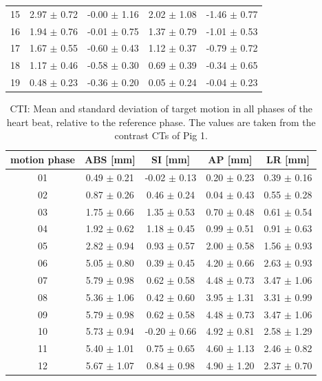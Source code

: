 \documentclass[type=dr, dr=rernat, accentcolor=tud7b,colorbacktitle, bigchapter, openright, twoside, 12pt ]{tudthesis}
\begin{document}
\begin{table}[htbp]
\begin{tabular}{|c|c|c|c|c|}
15 &2.97 $\pm$ 0.72 &-0.00 $\pm$ 1.16 &2.02 $\pm$ 1.08 &-1.46 $\pm$ 0.77 \\
16 &1.94 $\pm$ 0.76 &-0.01 $\pm$ 0.75 &1.37 $\pm$ 0.79 &-1.01 $\pm$ 0.53 \\
17 &1.67 $\pm$ 0.55 &-0.60 $\pm$ 0.43 &1.12 $\pm$ 0.37 &-0.79 $\pm$ 0.72 \\
18 &1.17 $\pm$ 0.46 &-0.58 $\pm$ 0.30 &0.69 $\pm$ 0.39 &-0.34 $\pm$ 0.65 \\
19 &0.48 $\pm$ 0.23 &-0.36 $\pm$ 0.20 &0.05 $\pm$ 0.24 &-0.04 $\pm$ 0.23 \\
    \hline\hline
  \end{tabular}
  \label{tab:motion:PV:Pig1}
\end{table}

\begin{table}[htbp]
  \centering
  \tiny
  \caption{CTI: Mean and standard deviation of target motion in all phases of the heart beat, relative to the reference phase. The values are 
  taken from the contrast CTs of Pig 1.}
  \begin{tabular}{|c|c|c|c|c|}
    \hline\hline
    motion phase\rule{0pt}{2.6ex}\rule[-1.2ex]{0pt}{0pt} & ABS [mm] & SI [mm] & AP [mm] & LR [mm]\\
    \hline
01 &0.49 $\pm$ 0.21 &-0.02 $\pm$ 0.13 &0.20 $\pm$ 0.23 &0.39 $\pm$ 0.16 \\
02 &0.87 $\pm$ 0.26 &0.46 $\pm$ 0.24 &0.04 $\pm$ 0.43 &0.55 $\pm$ 0.28 \\
03 &1.75 $\pm$ 0.66 &1.35 $\pm$ 0.53 &0.70 $\pm$ 0.48 &0.61 $\pm$ 0.54 \\
04 &1.92 $\pm$ 0.62 &1.18 $\pm$ 0.45 &0.99 $\pm$ 0.51 &0.91 $\pm$ 0.63 \\
05 &2.82 $\pm$ 0.94 &0.93 $\pm$ 0.57 &2.00 $\pm$ 0.58 &1.56 $\pm$ 0.93 \\
06 &5.05 $\pm$ 0.80 &0.39 $\pm$ 0.45 &4.20 $\pm$ 0.66 &2.63 $\pm$ 0.93 \\
07 &5.79 $\pm$ 0.98 &0.62 $\pm$ 0.58 &4.48 $\pm$ 0.73 &3.47 $\pm$ 1.06 \\
08 &5.36 $\pm$ 1.06 &0.42 $\pm$ 0.60 &3.95 $\pm$ 1.31 &3.31 $\pm$ 0.99 \\
09 &5.79 $\pm$ 0.98 &0.62 $\pm$ 0.58 &4.48 $\pm$ 0.73 &3.47 $\pm$ 1.06 \\
10 &5.73 $\pm$ 0.94 &-0.20 $\pm$ 0.66 &4.92 $\pm$ 0.81 &2.58 $\pm$ 1.29 \\
11 &5.40 $\pm$ 1.01 &0.75 $\pm$ 0.65 &4.60 $\pm$ 1.13 &2.46 $\pm$ 0.82 \\
12 &5.67 $\pm$ 1.07 &0.84 $\pm$ 0.98 &4.90 $\pm$ 1.20 &2.37 $\pm$ 0.70 \\

\end{tabular}
\end{table}
\end{document}

